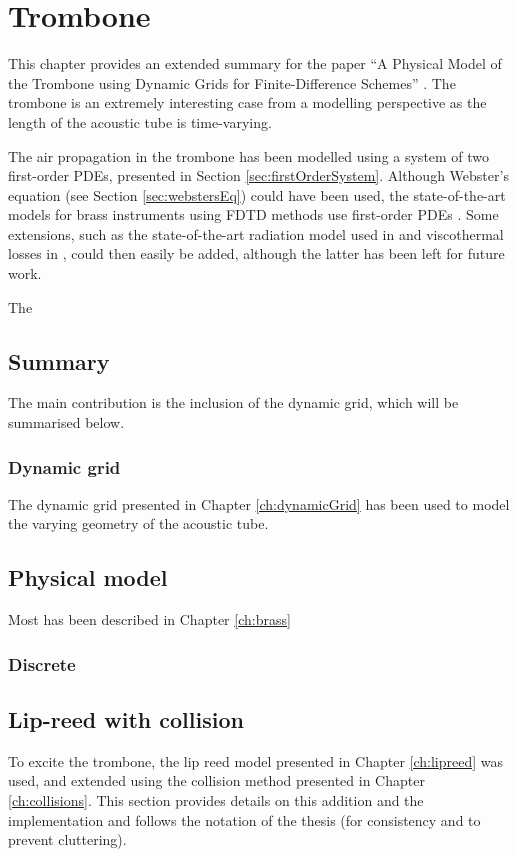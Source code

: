 \chapter{Trombone}\label{ch:trombone}
This chapter provides an extended summary for the paper ``A Physical Model of the Trombone using Dynamic Grids for Finite-Difference Schemes'' \citeP[H]. The trombone is an extremely interesting case from a modelling perspective as the length of the acoustic tube is time-varying. 

The air propagation in the trombone has been modelled using a system of two first-order PDEs, presented in Section \ref{sec:firstOrderSystem}. Although Webster's equation (see Section \ref{sec:webstersEq}) could have been used, the state-of-the-art models for brass instruments using FDTD methods use first-order PDEs \cite{Bilbao2016, Harrison2018}. Some extensions, such as the state-of-the-art radiation model used in \cite{Harrison2018} and viscothermal losses in \cite{Bilbao2016}, could then easily be added, although the latter has been left for future work.  


The 

\section{Summary}
The main contribution is the inclusion of the dynamic grid, which will be summarised below. 

\subsection{Dynamic grid}
The dynamic grid presented in Chapter \ref{ch:dynamicGrid} has been used to model the varying geometry of the acoustic tube. 

\section{Physical model}
Most has been described in Chapter \ref{ch:brass}

\subsection{Discrete}

\section{Lip-reed with collision}
\def\nph{}
\def\nphSys{n+1/2}
To excite the trombone, the lip reed model presented in Chapter \ref{ch:lipreed} was used, and extended using the collision method presented in Chapter \ref{ch:collisions}. This section provides details on this addition and the implementation and follows the notation of the thesis (for consistency and to prevent cluttering).

